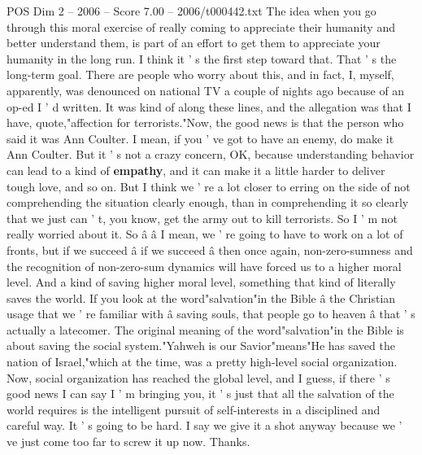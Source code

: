 \begin{textsample}{POS Dim 2 – 2006 – Score 7.00 – 2006/t000442.txt}
The idea when you go through this moral exercise of really coming to appreciate their humanity and better understand them, is part of an effort to get them to appreciate your humanity in the long run.
I think it ' s the first step toward that.
That ' s the long-term goal.
There are people who worry about this, and in fact, I, myself, apparently, was denounced on national TV a couple of nights ago because of an op-ed I ' d written.
It was kind of along these lines, and the allegation was that I have, quote,"affection for terrorists."Now, the good news is that the person who said it was Ann Coulter.
I mean, if you ' ve got to have an enemy, do make it Ann Coulter.
But it ' s not a crazy concern, OK, because understanding behavior can lead to a kind of \textbf{empathy}, and it can make it a little harder to deliver tough love, and so on.
But I think we ' re a lot closer to erring on the side of not comprehending the situation clearly enough, than in comprehending it so clearly that we just can ' t, you know, get the army out to kill terrorists.
So I ' m not really worried about it.
So â â I mean, we ' re going to have to work on a lot of fronts, but if we succeed â if we succeed â then once again, non-zero-sumness and the recognition of non-zero-sum dynamics will have forced us to a higher moral level.
And a kind of saving higher moral level, something that kind of literally saves the world.
If you look at the word"salvation"in the Bible â the Christian usage that we ' re familiar with â saving souls, that people go to heaven â that ' s actually a latecomer.
The original meaning of the word"salvation"in the Bible is about saving the social system."Yahweh is our Savior"means"He has saved the nation of Israel,"which at the time, was a pretty high-level social organization.
Now, social organization has reached the global level, and I guess, if there ' s good news I can say I ' m bringing you, it ' s just that all the salvation of the world requires is the intelligent pursuit of self-interests in a disciplined and careful way.
It ' s going to be hard.
I say we give it a shot anyway because we ' ve just come too far to screw it up now.
Thanks.

\end{textsample}
